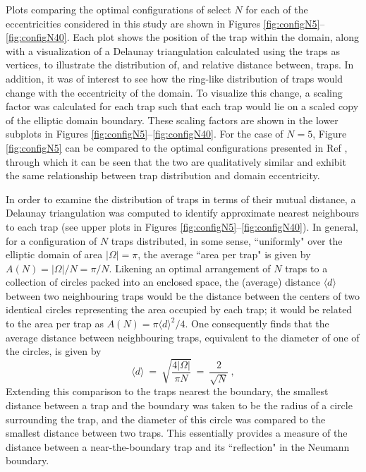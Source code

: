 \documentclass[11pt,letter,subeqn,fleqn]{article}
\newcommand{\es}{\ = \ }
\newcommand{\domMeas}{|\Omega|}     %
\begin{document}
Plots comparing the optimal configurations of select $N$ for each of the eccentricities considered in this study are shown in Figures \ref{fig:configN5}--\ref{fig:configN40}. Each plot shows the position of the trap within the domain, along with a visualization of a Delaunay triangulation \cite{lee1980two} calculated using the traps as vertices, to illustrate the distribution of, and relative distance between, traps. In addition, it was of interest to see how the ring-like distribution of traps would change with the eccentricity of the domain. To visualize this change, a scaling factor was calculated for each trap such that each trap would lie on a scaled copy of the elliptic domain boundary. These scaling factors are shown in the lower subplots in Figures \ref{fig:configN5}--\ref{fig:configN40}. For the case of $N=5$, Figure \ref{fig:configN5} can be compared to the optimal configurations presented in Ref \cite{iyaniwura2020optimization}, through which it can be seen that the two are qualitatively similar and exhibit the same relationship between trap distribution and domain eccentricity.

In order to examine the distribution of traps in terms of their mutual distance, a Delaunay triangulation was computed to identify approximate nearest neighbours to each trap (see upper plots in Figures \ref{fig:configN5}--\ref{fig:configN40}). In general, for a configuration of $N$ traps distributed, in some sense, ``uniformly" over the elliptic domain of area $\domMeas = \pi$, the average ``area per trap" is given by $A(N) = \domMeas/N = \pi/N$. Likening an optimal arrangement of $N$ traps to a collection of circles packed into an enclosed space, the (average)  distance $\langle d\rangle$  between two neighbouring traps would be the distance between the centers of two identical circles representing the area occupied by each trap; it would be related to the area per trap as $A(N)= \pi\langle d\rangle^2 / 4$. One consequently finds that the average  distance between neighbouring traps, equivalent to the diameter of one of the circles, is given by
\begin{equation} \label{eq:avgDist}
\langle d \rangle \es \sqrt{\dfrac{4 \domMeas}{\pi N}} \es \dfrac{2}{\sqrt{N}} \ ,
\end{equation}
Extending this comparison to the traps nearest the boundary, the smallest distance between a trap and the boundary was taken to be the radius of a circle surrounding the trap, and the diameter of this circle was compared to the smallest distance between two traps. This essentially provides a measure of the distance between a near-the-boundary trap and its ``reflection" in the Neumann boundary.
\end{document}
